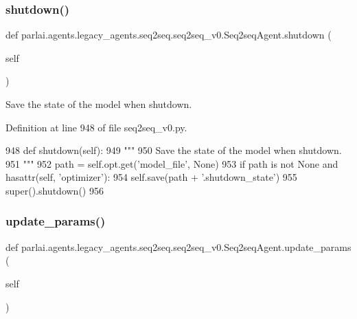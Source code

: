 \subsubsection{\texorpdfstring{shutdown()}{shutdown()}}
{\footnotesize\ttfamily def parlai.\+agents.\+legacy\+\_\+agents.\+seq2seq.\+seq2seq\+\_\+v0.\+Seq2seq\+Agent.\+shutdown (\begin{DoxyParamCaption}\item[{}]{self }\end{DoxyParamCaption})}

\begin{DoxyVerb}Save the state of the model when shutdown.
\end{DoxyVerb}
 

Definition at line 948 of file seq2seq\+\_\+v0.\+py.


\begin{DoxyCode}
948     \textcolor{keyword}{def }shutdown(self):
949         \textcolor{stringliteral}{"""}
950 \textcolor{stringliteral}{        Save the state of the model when shutdown.}
951 \textcolor{stringliteral}{        """}
952         path = self.opt.get(\textcolor{stringliteral}{'model\_file'}, \textcolor{keywordtype}{None})
953         \textcolor{keywordflow}{if} path \textcolor{keywordflow}{is} \textcolor{keywordflow}{not} \textcolor{keywordtype}{None} \textcolor{keywordflow}{and} hasattr(self, \textcolor{stringliteral}{'optimizer'}):
954             self.save(path + \textcolor{stringliteral}{'.shutdown\_state'})
955         super().shutdown()
956 
\end{DoxyCode}
\mbox{\label{classparlai_1_1agents_1_1legacy__agents_1_1seq2seq_1_1seq2seq__v0_1_1Seq2seqAgent_a3933d4fdc5e603b1a168d92e7da77151}} 
\subsubsection{\texorpdfstring{update\+\_\+params()}{update\_params()}}
{\footnotesize\ttfamily def parlai.\+agents.\+legacy\+\_\+agents.\+seq2seq.\+seq2seq\+\_\+v0.\+Seq2seq\+Agent.\+update\+\_\+params (\begin{DoxyParamCaption}\item[{}]{self }\end{DoxyParamCaption})}

